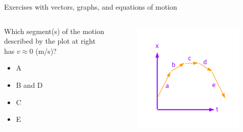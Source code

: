 \documentclass{beamer}
\begin{document}
\begin{frame}{Exercises with vectors, graphs, and equations of motion}
\begin{columns}[T]
\begin{column}{0.4\textwidth}
\small
Which segment(s) of the motion described by the plot at right has $v\approx0$ (m/s)?
\begin{itemize}
\item A
\item B and D
\item C
\item E
\end{itemize}
\end{column}
\begin{column}{0.6\textwidth}
\begin{figure}
\centering
\includegraphics[width=\textwidth,trim=0cm 0cm 0cm 1.5cm,clip=true]{figures/Vectors2.pdf}
\end{figure}
\end{column}
\end{columns}
\end{frame}
\end{document}

